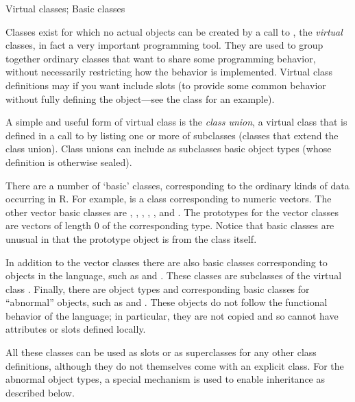 \begin{Section}{Virtual classes; Basic classes}

Classes exist for which no actual objects can be created by a
call to , the
\emph{virtual} classes, in fact a
very important programming tool.  They are used to group together
ordinary classes that want to share some programming behavior,
without necessarily restricting how the behavior is implemented.
Virtual class definitions may if you want include
slots (to provide some common behavior without fully defining
the object---see the class  for an example).

A simple and useful form of virtual class is the \emph{class
union}, a virtual class that is defined in a call to
 by listing one or
more of subclasses (classes that extend the class union).  Class
unions can include as subclasses basic object types (whose
definition is otherwise sealed).

There are a number of `basic' classes, corresponding to the
ordinary kinds of data occurring in R.  For example,
 is a class corresponding to numeric vectors.
The other vector basic classes are , ,
, ,  , 
and .
The prototypes for
the vector classes are vectors of length 0 of the corresponding
type.  Notice that basic classes are unusual in that the
prototype object is from the class itself.

In addition to the vector classes there are also basic classes
corresponding to objects in the
language, such as  and .
These classes are subclasses of the virtual class .
Finally, there are object types and corresponding basic classes for
``abnormal'' objects, such as  and
.
These objects do not follow the
functional behavior of the language; in particular, they are not
copied and so cannot have attributes or slots defined locally.

All these classes can be used as slots or as
superclasses for any other class definitions, although they do
not themselves come with an explicit class.  For the abnormal
object types, a special mechanism is used to enable inheritance
as described below.


\end{Section}
%
